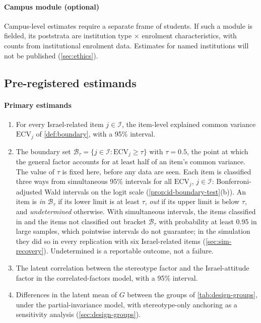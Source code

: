 \paragraph{Campus module (optional)}
Campus-level estimates require a separate frame of students. If such a module is fielded, its poststrata are institution type $\times$ enrolment characteristics, with counts from institutional enrolment data. Estimates for named institutions will not be published (\cref{sec:ethics}).

\subsection{Pre-registered estimands}\label{sec:design-estimands}

\paragraph{Primary estimands}
\begin{enumerate}[(E1)]
  \item For every Israel-related item $j\in\mathcal{I}$, the item-level explained common variance $\mathrm{ECV}_j$ of \cref{def:boundary}, with a 95\% interval.
  \item The boundary set $\mathcal{B}_\tau=\{j\in\mathcal{I}:\mathrm{ECV}_j\ge\tau\}$ with $\tau=0.5$, the point at which the general factor accounts for at least half of an item's common variance. The value of $\tau$ is fixed here, before any data are seen. Each item is classified three ways from simultaneous 95\% intervals for all $\mathrm{ECV}_j$, $j\in\mathcal{I}$: Bonferroni-adjusted Wald intervals on the logit scale (\cref{prop:id-boundary-test}(b)). An item is \emph{in} $\mathcal{B}_\tau$ if its lower limit is at least $\tau$, \emph{out} if its upper limit is below $\tau$, and \emph{undetermined} otherwise. With simultaneous intervals, the items classified in and the items not classified out bracket $\mathcal{B}_\tau$ with probability at least 0.95 in large samples, which pointwise intervals do not guarantee; in the simulation they did so in every replication with six Israel-related items (\cref{sec:sim-recovery}). Undetermined is a reportable outcome, not a failure.
  \item The latent correlation between the stereotype factor and the Israel-attitude factor in the correlated-factors model, with a 95\% interval.
  \item Differences in the latent mean of $G$ between the groups of \cref{tab:design-groups}, under the partial-invariance model, with stereotype-only anchoring as a sensitivity analysis (\cref{sec:design-groups}).
\end{enumerate}

